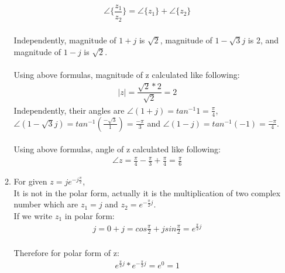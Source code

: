 \documentclass[10pt,a4paper, margin=1in]{article}
\begin{document}
\begin{enumerate}
\begin{enumerate}
\begin{gather*}
        \angle \{\dfrac{z_1}{z_2}\}=\angle \{z_1\} + \angle \{z_2\}
    \end{gather*} \\
    Independently, magnitude of $1+j$ is $\sqrt{2}$, magnitude of $1-\sqrt{3}j$ is 2, and magnitude of $1-j$ is $\sqrt{2}$. \\ \\Using above formulas, magnitude of z calculated like following:
    \begin{gather*}
        |z|=\dfrac{\sqrt{2}*2}{\sqrt{2}}=2
    \end{gather*}
    Independently, their  angles are $\angle (1+j) = tan^{-1}1 = \frac{\pi}{4}$, $\angle (1-\sqrt{3}j) = tan^{-1}({\frac{-\sqrt{3}}{1}}) = \frac{-\pi}{3}$ and $\angle (1-j) = tan^{-1}(-1) = \frac{-\pi}{4}$. \\\\
    Using above formulas, angle of z calculated like following:
    \begin{gather*}
        \angle z = \frac{\pi}{4} - \frac{\pi}{3} + \frac{\pi}{4} = \frac{\pi}{6}
    \end{gather*}

    \item For given $z=je^{-j\frac{\pi}{2}}$,\\
    It is not in the polar form, actually it is the multiplication of two complex number which are $z_1=j$ and $z_2=e^{-\frac{\pi}{2}j}$. \\
    If we write $z_1$ in polar form:
    \begin{gather*}
        j=0+j=cos\frac{\pi}{2}+jsin\frac{\pi}{2}=e^{\frac{\pi}{2}j}
    \end{gather*} \\
    Therefore for polar form of z:
    \begin{gather*}
       e^{\frac{\pi}{2}j}*e^{-\frac{\pi}{2}j} = e^0 = 1
    \end{gather*}

    \end{enumerate}



\end{enumerate}
\end{document}
